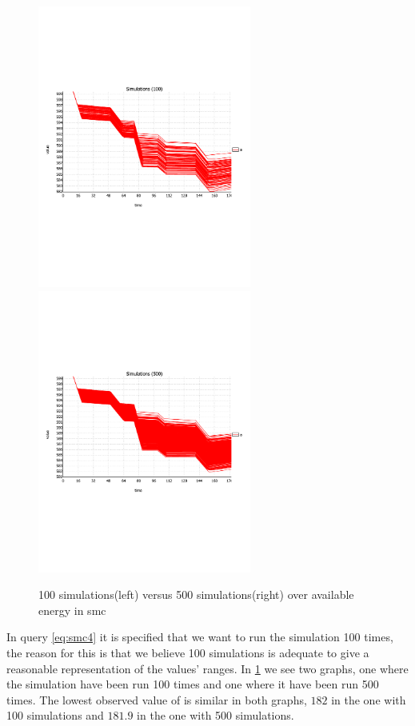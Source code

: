 \begin{figure}[H]%
	\centering
	\subfloat
	{{\includegraphics[width=7cm, trim={0 8cm 0 6cm},clip] {graphics/simulation_graphs/SimulationsA100.pdf} }}%
	\qquad
	\subfloat
	{{\includegraphics[width=7cm, trim={0 8cm 0 6cm},clip] {graphics/simulation_graphs/SimulationsA500.pdf} }}%
	\caption{100 simulations(left) versus 500 simulations(right) over available energy  in \gls{smc}}%
	\label{fig:sim_amount}%
\end{figure}
In query \ref{eq:smc4} it is specified that we want to run the simulation 100 times, the reason for this is that we believe 100 simulations is adequate to give a reasonable representation of the values' ranges.
In \cref{fig:sim_amount} we see two graphs, one where the simulation have been run 100 times and one where it have been run 500 times.
The lowest observed value of  is similar in both graphs, $182$ in the one with 100 simulations and $181.9$ in the one with 500 simulations.
